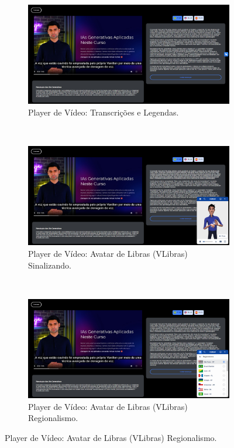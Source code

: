 \begin{figure}[htbp]
\centering
\caption{\textit{Screenshots} da Demo do Player Apresentada no HICSS.}
\label{fig:chapter4-cs2-poc-demo}
\begin{subfigure}[b]{0.83\textwidth}
\centering
\includegraphics[width=\textwidth]{images/chapter4-cs2-poc-demo1.png}
\caption{Player de Vídeo: Transcrições e Legendas.}
\label{fig:chapter4-cs2-poc-demo1}
\end{subfigure} ~
\begin{subfigure}[b]{0.83\textwidth}
\centering
\includegraphics[width=\textwidth]{images/chapter4-cs2-poc-demo2.png}
\caption{Player de Vídeo: Avatar de Libras (VLibras) Sinalizando.}
\label{fig:chapter4-cs2-poc-demo2}
\end{subfigure} ~
\begin{subfigure}[b]{0.83\textwidth}
\centering
\includegraphics[width=\textwidth]{images/chapter4-cs2-poc-demo3.png}
\caption{Player de Vídeo: Avatar de Libras (VLibras) Regionalismo.}
\label{fig:chapter4-cs2-poc-demo3}
\end{subfigure}
\fautor
\end{figure}

